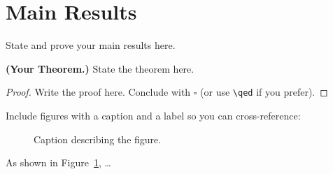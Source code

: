 
\section{Main Results}

State and prove your main results here.

\begin{theorembox}
  \textbf{(Your Theorem.)}  State the theorem here.
\end{theorembox}

\begin{proof}
  Write the proof here.  Conclude with $\square$
  (or use \verb|\qed| if you prefer).
\end{proof}

Include figures with a caption and a label so you can cross-reference:

\begin{figure}[ht]
  \centering
  \caption{Caption describing the figure.}
  \label{fig:example}
\end{figure}

As shown in Figure~\ref{fig:example}, \ldots
